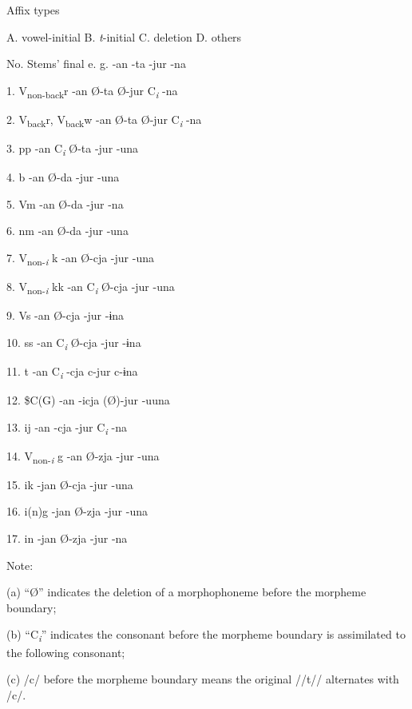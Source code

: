 \begin{table}
\caption{\label{tab:key:58}Different applications of rules to verbal stems and affixes showing their surface forms}

    Affix types

    A. vowel-initial  B. \textit{t}-initial  C. deletion  D. others

No.  Stems’ final  e. g.  -an  -ta  -jur  -na

1.  V\textsubscript{non-back}r    -an  Ø-ta  Ø-jur  C\textit{\textsubscript{i} }-na

2.  V\textsubscript{back}r, V\textsubscript{back}w    -an  Ø-ta  Ø-jur  C\textit{\textsubscript{i} }-na

3.  pp    -an  C\textit{\textsubscript{i} }Ø-ta  -jur  -una

4.  b    -an  Ø-da  -jur  -una

5.  Vm    -an  Ø-da  -jur  -na

6.  nm    -an  Ø-da  -jur  -una

7.  V\textsubscript{non-}\textit{\textsubscript{i}} k    -an  Ø-cja  -jur  -una

8.  V\textsubscript{non-}\textit{\textsubscript{i}} kk    -an  C\textit{\textsubscript{i} }Ø-cja  -jur  -una

9.  Vs    -an  Ø-cja  -jur  -ɨna

10.  ss    -an  C\textit{\textsubscript{i} }Ø-cja  -jur  -ɨna

11.  t    -an  C\textit{\textsubscript{i} }-cja  c-jur  c-ɨna

12.  \$C(G)    -an  -icja  (Ø)-jur  -uuna

13.  ij    -an  -cja  -jur  C\textit{\textsubscript{i} }-na

14.  V\textsubscript{non-}\textit{\textsubscript{i} }g    -an  Ø-zja  -jur  -una

15.  ik    -jan  Ø-cja  -jur  -una

16.  i(n)g    -jan  Ø-zja  -jur  -una

17.  in    -jan  Ø-zja  -jur  -na

Note:

(a) “Ø” indicates the deletion of a morphophoneme before the morpheme boundary;

(b) “C\textit{\textsubscript{i}}” indicates the consonant before the morpheme boundary is assimilated to the following consonant;

(c) /c/ before the morpheme boundary means the original //t// alternates with /c/.
\end{table}

